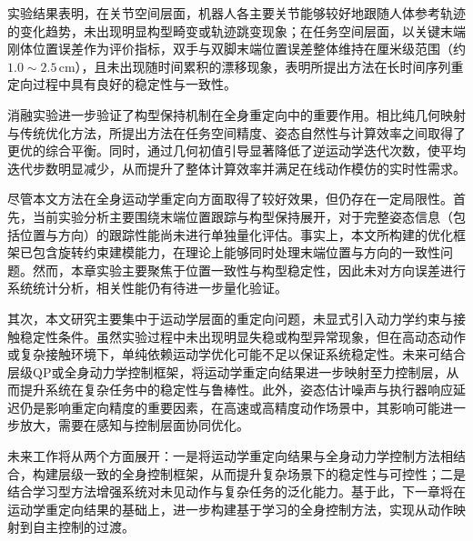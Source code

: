 实验结果表明，在关节空间层面，机器人各主要关节能够较好地跟随人体参考轨迹的变化趋势，未出现明显构型畸变或轨迹跳变现象；在任务空间层面，以关键末端刚体位置误差作为评价指标，双手与双脚末端位置误差整体维持在厘米级范围（约 $1.0\sim2.5\,\mathrm{cm}$），且未出现随时间累积的漂移现象，表明所提出方法在长时间序列重定向过程中具有良好的稳定性与一致性。

消融实验进一步验证了构型保持机制在全身重定向中的重要作用。相比纯几何映射与传统优化方法，所提出方法在任务空间精度、姿态自然性与计算效率之间取得了更优的综合平衡。同时，通过几何初值引导显著降低了逆运动学迭代次数，使平均迭代步数明显减少，从而提升了整体计算效率并满足在线动作模仿的实时性需求。


尽管本文方法在全身运动学重定向方面取得了较好效果，但仍存在一定局限性。首先，当前实验分析主要围绕末端位置跟踪与构型保持展开，对于完整姿态信息（包括位置与方向）的跟踪性能尚未进行单独量化评估。事实上，本文所构建的优化框架已包含旋转约束建模能力，在理论上能够同时处理末端位置与方向的一致性问题。然而，本章实验主要聚焦于位置一致性与构型稳定性，因此未对方向误差进行系统统计分析，相关性能仍有待进一步量化验证。

其次，本文研究主要集中于运动学层面的重定向问题，未显式引入动力学约束与接触稳定性条件。虽然实验过程中未出现明显失稳或构型异常现象，但在高动态动作或复杂接触环境下，单纯依赖运动学优化可能不足以保证系统稳定性。未来可结合层级QP或全身动力学控制框架，将运动学重定向结果进一步映射至力控制层，从而提升系统在复杂任务中的稳定性与鲁棒性。此外，姿态估计噪声与执行器响应延迟仍是影响重定向精度的重要因素，在高速或高精度动作场景中，其影响可能进一步放大，需要在感知与控制层面协同优化。

未来工作将从两个方面展开：一是将运动学重定向结果与全身动力学控制方法相结合，构建层级一致的全身控制框架，从而提升复杂场景下的稳定性与可控性；二是结合学习型方法增强系统对未见动作与复杂任务的泛化能力。基于此，下一章将在运动学重定向结果的基础上，进一步构建基于学习的全身控制方法，实现从动作映射到自主控制的过渡。